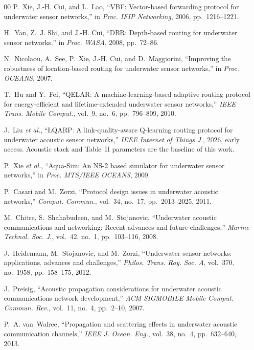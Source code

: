 \documentclass[journal]{IEEEtran}
\begin{document}
\begin{thebibliography}{00}
P.~Xie, J.-H. Cui, and L.~Lao, ``{VBF}: Vector-based forwarding protocol for underwater sensor networks,'' in \emph{Proc. IFIP Networking}, 2006, pp.~1216--1221.

H.~Yan, Z.~J. Shi, and J.-H. Cui, ``{DBR}: Depth-based routing for underwater sensor networks,'' in \emph{Proc. WASA}, 2008, pp.~72--86.

N.~Nicolaou, A.~See, P.~Xie, J.-H. Cui, and D.~Maggiorini, ``Improving the robustness of location-based routing for underwater sensor networks,'' in \emph{Proc. OCEANS}, 2007.

T.~Hu and Y.~Fei, ``{QELAR}: A machine-learning-based adaptive routing protocol for energy-efficient and lifetime-extended underwater sensor networks,'' \emph{{IEEE} Trans. Mobile Comput.}, vol.~9, no.~6, pp.~796--809, 2010.

J.~Liu \emph{et al.}, ``{LQARP}: A link-quality-aware {Q}-learning routing protocol for underwater acoustic sensor networks,'' \emph{{IEEE} Internet of Things J.}, 2026, early access. Acoustic stack and Table~II parameters are the baseline of this work.

P.~Xie \emph{et al.}, ``Aqua-{Sim}: An {NS}-2 based simulator for underwater sensor networks,'' in \emph{Proc. MTS/{IEEE} OCEANS}, 2009.

P.~Casari and M.~Zorzi, ``Protocol design issues in underwater acoustic networks,'' \emph{Comput. Commun.}, vol.~34, no.~17, pp.~2013--2025, 2011.

M.~Chitre, S.~Shahabudeen, and M.~Stojanovic, ``Underwater acoustic communications and networking: Recent advances and future challenges,'' \emph{Marine Technol. Soc. J.}, vol.~42, no.~1, pp.~103--116, 2008.

J.~Heidemann, M.~Stojanovic, and M.~Zorzi, ``Underwater sensor networks: applications, advances and challenges,'' \emph{Philos. Trans. Roy. Soc. A}, vol.~370, no.~1958, pp.~158--175, 2012.

J.~Preisig, ``Acoustic propagation considerations for underwater acoustic communications network development,'' \emph{{ACM} {SIGMOBILE} Mobile Comput. Commun. Rev.}, vol.~11, no.~4, pp.~2--10, 2007.

P.~A. van~Walree, ``Propagation and scattering effects in underwater acoustic communication channels,'' \emph{{IEEE} J. Ocean. Eng.}, vol.~38, no.~4, pp.~632--640, 2013.


\end{thebibliography}
\end{document}
